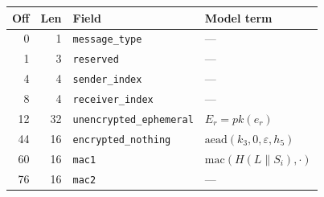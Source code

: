 \begin{tabular}{@{}rrll@{}}
\toprule
Off & Len & Field & Model term \\
\midrule
0 & 1 & \texttt{message\_type} & \textcolor{black!45}{---} \\
1 & 3 & \texttt{reserved} & \textcolor{black!45}{---} \\
4 & 4 & \texttt{sender\_index} & \textcolor{black!45}{---} \\
8 & 4 & \texttt{receiver\_index} & \textcolor{black!45}{---} \\
12 & 32 & \texttt{unencrypted\_ephemeral} & $E_r=\mathit{pk}(e_r)$ \\
44 & 16 & \texttt{encrypted\_nothing} & $\mathrm{aead}(k_3,0,\varepsilon,h_5)$ \\
60 & 16 & \texttt{mac1} & $\mathrm{mac}(H(L\|S_i),\cdot)$ \\
76 & 16 & \texttt{mac2} & \textcolor{black!45}{---} \\
\bottomrule
\end{tabular}
